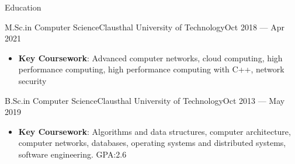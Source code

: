 \documentclass[]{mcdowellcv}
\begin{document}
\makeheader

\begin{cvsection}{Education}
\begin{cvsubsection}{M.Sc.\@ in Computer Science}{Clausthal University of Technology}{Oct 2018 --- Apr 2021}
\bigskip
\begin{itemize}
\item \textbf{Key Coursework}: Advanced computer networks, cloud computing, high performance computing, high performance computing with C++, network security
\end{itemize}
\end{cvsubsection}
\begin{cvsubsection}{B.Sc.\@ in Computer Science}{Clausthal University of Technology}{Oct 2013 --- May 2019}
\bigskip
\begin{itemize}
\item \textbf{Key Coursework}: Algorithms and data structures, computer architecture, computer networks, databases, operating systems and distributed systems, software engineering. GPA:\@ 2.6
\end{itemize}
\end{cvsubsection}


\end{cvsection}
\end{document}

